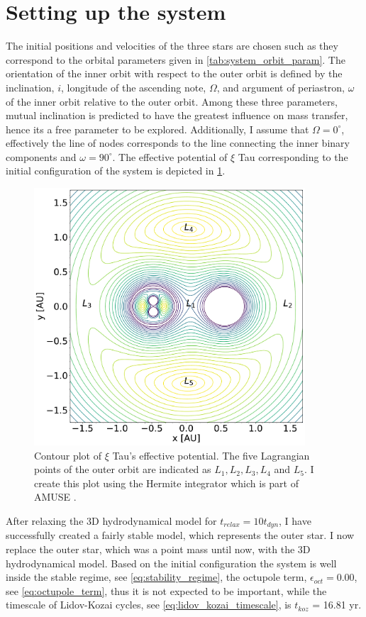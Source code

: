 \section{Setting up the system}

The initial positions and velocities of the three stars are chosen such as they correspond to the orbital parameters given in \cref{tab:system_orbit_param}. The orientation of the inner orbit with respect to the outer orbit is defined by the inclination, $i$, longitude of the ascending note, $\Omega$, and argument of periastron, $\omega$ of the inner orbit relative to the outer orbit. Among these three parameters, mutual inclination is predicted to have the greatest influence on mass transfer, hence its a free parameter to be explored.  Additionally, I assume that  $\Omega=0^{\circ}$, effectively the line of nodes corresponds to the line connecting the inner binary components and $\omega= 90^{\circ}$. The effective potential of $\xi$ Tau corresponding to the initial configuration of the system is depicted in \cref{fig:triple_equop}.
\begin{figure}[H]
    \centering
    \includegraphics[width=0.9\textwidth]{Thesis/graphs/triple_equop.pdf}
    \caption{Contour plot of $\xi$ Tau's effective potential. The five Lagrangian points of the outer orbit are indicated as $L_1, L_2, L_3, L_4$ and $L_5$. I create this plot using the Hermite integrator which is part of  AMUSE \citep{hut1995building}.}
    \label{fig:triple_equop}
\end{figure}
After relaxing the 3D hydrodynamical model for $t_{relax} =10 t_{dyn}$, I have successfully created a fairly stable model, which represents the outer star. I now replace the outer star, which was a point mass until now, with the 3D hydrodynamical model. Based on the initial configuration the system is well inside the stable regime, see \cref{eq:stability_regime}, the octupole term, $\epsilon_{oct} = 0.00$, see \cref{eq:octupole_term}, thus it is not expected to be important, while the timescale of Lidov-Kozai cycles, see \cref{eq:lidov_kozai_timescale}, is $t_{koz}$ = 16.81 yr.